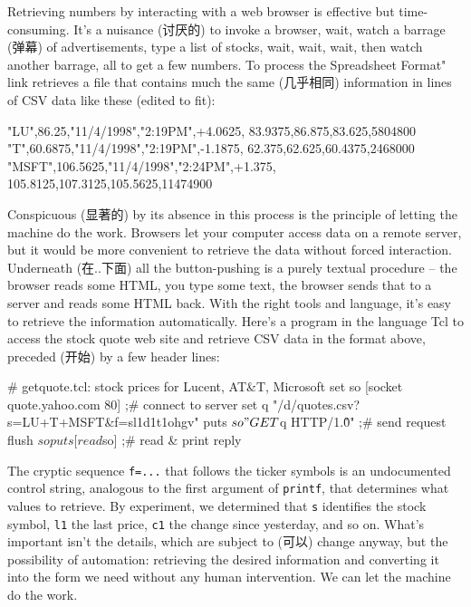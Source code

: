 Retrieving numbers by interacting with a web browser is effective but
time-consuming. It's a nuisance (讨厌的) to invoke a browser, wait, watch a
barrage (弹幕) of advertisements, type a list of stocks, wait, wait, wait,
then watch another barrage, all to get a few numbers. To process the
Spreadsheet Format" link retrieves a file that contains much the same
(几乎相同) information in lines of CSV data like these (edited to fit):
\begin{wellcode}
    "LU",86.25,"11/4/1998","2:19PM",+4.0625,
            83.9375,86.875,83.625,5804800
    "T",60.6875,"11/4/1998","2:19PM",-1.1875,
            62.375,62.625,60.4375,2468000
    "MSFT",106.5625,"11/4/1998","2:24PM",+1.375,
            105.8125,107.3125,105.5625,11474900
\end{wellcode}

Conspicuous (显著的) by its absence in this process is the principle of
letting the machine do the work. Browsers let your computer access data on
a remote server, but it would be more convenient to retrieve the data
without forced interaction. Underneath (在..下面) all the button-pushing is
a purely textual procedure -- the browser reads some HTML, you type some
text, the browser sends that to a server and reads some HTML back. With the
right tools and language, it's easy to retrieve the information
automatically.  Here's a program in the language Tcl to access the stock
quote web site and retrieve CSV data in the format above, preceded (开始)
by a few header lines:
\begin{wellcode}
    # getquote.tcl: stock prices for Lucent, AT&T, Microsoft
    set so [socket quote.yahoo.com 80]  ;# connect to server
    set q "/d/quotes.csv?s=LU+T+MSFT&f=sl1d1t1ohgv"
    puts $so "GET $q HTTP/1.0\r\n\r\n"  ;# send request
    flush $so
    puts [read $so]                     ;# read & print reply
\end{wellcode}
The cryptic sequence \verb'f=...' that follows the ticker symbols is an
undocumented control string, analogous to the first argument of
\verb'printf', that determines what values to retrieve. By experiment, we
determined that \verb's' identifies the stock symbol, \verb'l1' the last
price, \verb'c1' the change since yesterday, and so on. What's important
isn't the details, which are subject to (可以) change anyway, but the
possibility of automation: retrieving the desired information and
converting it into the form we need without any human intervention. We can
let the machine do the work.

